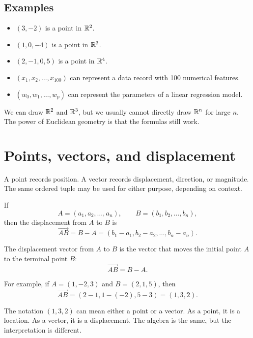 \subsection*{Examples}

\begin{itemize}
  \item $(3,-2)$ is a point in $\mathbb{R}^2$.
  \item $(1,0,-4)$ is a point in $\mathbb{R}^3$.
  \item $(2,-1,0,5)$ is a point in $\mathbb{R}^4$.
  \item $(x_1,x_2,\ldots,x_{100})$ can represent a data record with 100 numerical features.
  \item $(w_0,w_1,\ldots,w_p)$ can represent the parameters of a linear regression model.
\end{itemize}

We can draw $\mathbb{R}^2$ and $\mathbb{R}^3$, but we usually cannot directly draw $\mathbb{R}^n$ for large $n$. The power of Euclidean geometry is that the formulas still work.

\section{Points, vectors, and displacement}

A point records position. A vector records displacement, direction, or magnitude. The same ordered tuple may be used for either purpose, depending on context.

If
\[
  A=(a_1,a_2,\ldots,a_n),\qquad B=(b_1,b_2,\ldots,b_n),
\]
then the displacement from $A$ to $B$ is
\[
  \overrightarrow{AB}=B-A=(b_1-a_1,b_2-a_2,\ldots,b_n-a_n).
\]

\begin{definitionbox}[title={Displacement vector}]
The displacement vector from $A$ to $B$ is the vector that moves the initial point $A$ to the terminal point $B$:
\[
  \overrightarrow{AB}=B-A.
\]
\end{definitionbox}

For example, if $A=(1,-2,3)$ and $B=(2,1,5)$, then
\[
  \overrightarrow{AB}=(2-1,1-(-2),5-3)=(1,3,2).
\]

\begin{notebox}[title={Point versus vector}]
The notation $(1,3,2)$ can mean either a point or a vector. As a point, it is a location. As a vector, it is a displacement. The algebra is the same, but the interpretation is different.
\end{notebox}

